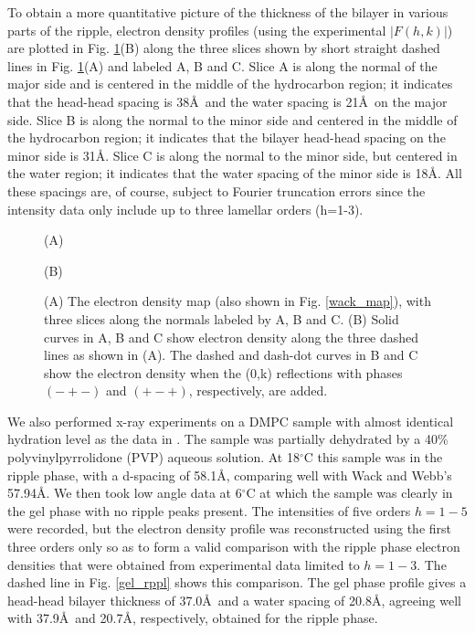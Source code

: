 To obtain a more quantitative picture of the thickness of the
bilayer in various parts of the ripple, electron density profiles
(using the experimental $|F(h,k)|$)
are plotted in Fig. \ref{slice}(B) along the three slices shown by short 
straight dashed lines in Fig. \ref{slice}(A) and labeled A, B and C.
Slice A is along the normal of the major side and is centered in the
middle of the hydrocarbon region; it indicates that the head-head 
spacing is 38\AA\ and the water spacing is 21\AA\ on the major side.
Slice B is along the normal to the minor side and centered
in the middle of the hydrocarbon region; it indicates that
the bilayer head-head spacing on the minor side is 31\AA.
Slice C is along the normal to the minor side, but centered in
the water region; it indicates that the water spacing of the
minor side is 18\AA.  All these spacings are, of course, subject to 
Fourier truncation errors since the intensity data only include up 
to three lamellar orders (h=1-3).

\begin{figure}
\begin{center}
\leavevmode
\hspace{3.2in} (A)
\end{center}
\begin{center}
\leavevmode
\end{center}
\vspace{-0.2in}
\hspace{3.0in} (B) 
\caption{(A) The electron density map (also shown in Fig. \ref{wack_map}), 
with three slices along
the normals labeled by A, B and C. 
(B) Solid curves in A, B and C show electron density along the three 
dashed lines as shown in (A).  
The dashed and dash-dot curves in B and C show the electron density when
the (0,k) reflections with phases $(-+-)$ and $(+-+)$, respectively, are
added.
\label{slice}}
\end{figure}

We also performed x-ray experiments on a DMPC sample with almost identical
hydration level as the data in \cite{Wac89a}. 
The sample was partially dehydrated by a 40\% polyvinylpyrrolidone
(PVP) aqueous solution.  At 18$^{\circ}$C
this sample was in the ripple phase, with a d-spacing of 58.1\AA, comparing 
well with Wack and Webb's 57.94\AA.  We then took
low angle data at 6$^{\circ}$C at which the sample was clearly in the
gel phase with no ripple peaks present. The intensities of five orders 
$h=1-5$ were
recorded, but the electron density profile was reconstructed using
the first three orders only so as to form a valid comparison 
with the ripple phase electron densities that were obtained from 
experimental data limited to $h=1-3$.  
The dashed line in Fig. \ref{gel_rppl} shows this comparison.
The gel phase profile gives a head-head bilayer thickness of 37.0\AA\ and
a water spacing of 20.8\AA, agreeing well with 37.9\AA\ and 20.7\AA,
respectively, obtained for the ripple phase.

